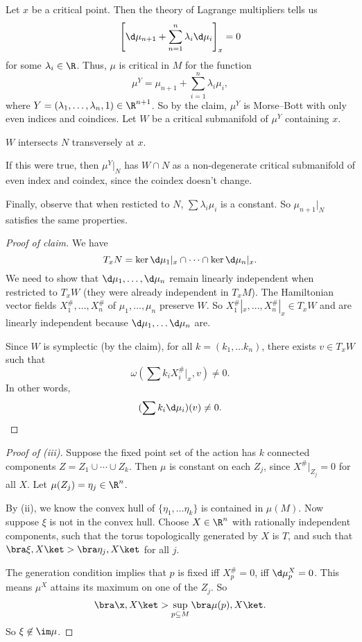 \documentclass[a4paper]{article}
\begin{document}
Let $x$ be a critical point. Then the theory of Lagrange multipliers tells us
\[
  \left[\d \mu_{n + 1} + \sum_{n = 1}^n \lambda_i \d \mu_i\right]_x = 0
\]
for some $\lambda_i \in \R$. Thus, $\mu$ is critical in $M$ for the function
\[
  \mu^Y = \mu_{n + 1} + \sum_{i = 1}^n \lambda_i \mu_i,
\]
where $Y = (\lambda_1, \ldots, \lambda_n, 1) \in \R^{n + 1}$. So by the claim, $\mu^Y$ is Morse--Bott with only even indices and coindices. Let $W$ be a critical submanifold of $\mu^Y$ containing $x$.
\begin{claim}
  $W$ intersects $N$ transversely at $x$.
\end{claim}
If this were true, then $\mu^Y|_N$ has $W \cap N$ as a non-degenerate critical submanifold of even index and coindex, since the coindex doesn't change. %

Finally, observe that when resticted to $N$, $\sum \lambda_i \mu_i$ is a constant. So $\mu_{n + 1}|_N$ satisfies the same properties.

\begin{proof}[Proof of claim]
  We have
  \[
    T_x N = \ker \d \mu_1|_x \cap \cdots \cap \ker \d \mu_n|_x.
  \]
  We need to show that $\d \mu_1, \ldots, \d \mu_n$ remain linearly independent when restricted to $T_x W$ (they were already independent in $T_x M$). The Hamiltonian vector fields $X_1^\#, \ldots, X_n^\#$ of $\mu_1, \ldots, \mu_n$ preserve $W$. So $X_1^\#|_x, \ldots, X^\#_n|_x \in T_x W$ and are linearly independent because $\d \mu_1, \ldots \d \mu_n$ are.

  Since $W$ is symplectic (by the claim), for all $k = (k_1, \ldots k_n)$, there exists $v \in T_x W$ such that
  \[
    \omega \left(\sum k_i X_i^\#|_x, v\right) \not= 0.
  \]
  In other words,
  \[
    (\sum k_i \d \mu_i)(v) \not= 0.\qedhere
  \]
\end{proof}

\begin{proof}[Proof of (iii)]
  Suppose the fixed point set of the action has $k$ connected components $Z = Z_1 \cup \cdots \cup Z_k$. Then $\mu$ is constant on each $Z_j$, since $X^\#|_{Z_j} = 0$ for all $X$. Let $\mu(Z_j) = \eta_j \in \R^n$.

  By (ii), we know the convex hull of $\{\eta_1, \ldots \eta_k\}$ is contained in $\mu(M)$. Now suppose $\xi$ is not in the convex hull. Choose $X \in \R^n$ with rationally independent components, such that the torus topologically generated by $X$ is $T$, and such that $\bra \xi, X\ket > \bra \eta_j, X\ket$ for all $j$.

  The generation condition implies that $p$ is fixed iff $X_p^\# = 0$, iff $\d \mu_p^X = 0$. This means $\mu^X$ attains its maximum on one of the $Z_j$. So
  \[
    \bra \x, X\ket > \sup_{p \subseteq M} \bra \mu(p), X\ket.
  \]
  So $\xi \not \in \im \mu$.
\end{proof}

\printindex
\end{document}
